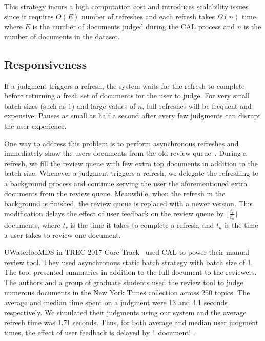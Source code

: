 This strategy incurs a high computation cost and introduces scalability issues
since it requires $O(E)$ number of refreshes and each refresh takes $\Omega(n)$
time, where $E$ is the number of documents judged during the CAL process and
$n$ is the number of documents in the dataset.

\subsection{Responsiveness}
\label{sec:async}
If a judgment triggers a refresh, the system waits for the refresh to complete
before returning a fresh set of documents for the user to judge.
For very small batch sizes (such as $1$) and large values of $n$, full refreshes
will be frequent and expensive. Pauses as small as half a second after every few
judgments can disrupt the user experience.

One way to address this problem is to perform asynchronous refreshes and
immediately show the users documents from the old review
queue~\cite{sigirdemo}. During a refresh, we fill the review queue
with few extra top documents in addition to the batch size. Whenever a judgment
triggers a refresh, we delegate the refreshing to a background process and
continue serving the user the aforementioned extra documents from the review
queue. Meanwhile, when the refresh in the background is finished, the review
queue is replaced with a newer version. This modification delays the effect of
user feedback on the review queue by $\lceil\frac{t_r}{t_u}\rceil$ documents,
where $t_r$ is the time it takes to complete a refresh, and $t_u$ is the time a
user takes to review one document.

UWaterlooMDS in TREC 2017 Core Track~\cite{zhang2017uwaterloomds} used CAL to
power their manual review tool.  They used asynchronous static batch strategy
with batch size of 1. The tool presented summaries in addition to the full
document to the reviewers.  The authors and a group of graduate students used
the review tool to judge numerous documents in the New York Times collection
across 250 topics. The average and median time spent on a judgment were 13 and
4.1 seconds respectively. We simulated their judgments using our system and the
average refresh time was 1.71 seconds. Thus, for both average and median user
judgment times, the effect of user feedback is delayed by 1 document! .

